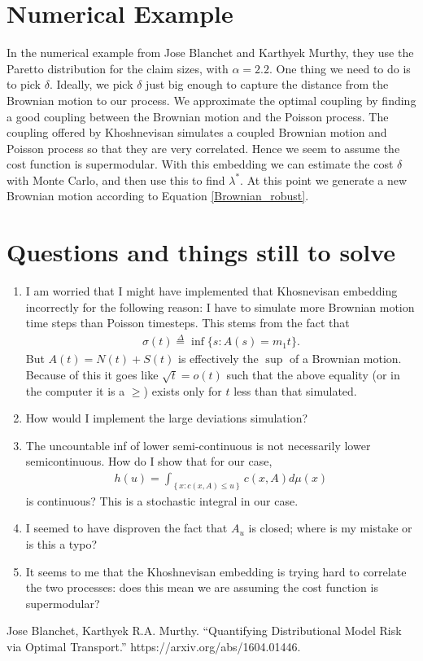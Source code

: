 \documentclass[12pt]{article}
\newcommand{\define}{\overset{\Delta}{=}}
\theoremstyle{definition}
\theoremstyle{definition}
\theoremstyle{definition}
\begin{document}
\section*{Numerical Example}
In the numerical example from Jose Blanchet and Karthyek Murthy, they use the Paretto distribution for the claim sizes, with $\alpha=2.2$. One thing we need to do is to pick $\delta$. Ideally, we pick $\delta$ just big enough to capture the distance from the Brownian motion to our process. We approximate the optimal coupling by finding a good coupling between the Brownian motion and the Poisson process. The coupling offered by Khoshnevisan simulates a coupled Brownian motion and Poisson process so that they are very correlated. Hence we seem to assume the cost function is supermodular. With this embedding we can estimate the cost $\delta$ with Monte Carlo, and then use this to find $\lambda^*$. At this point we generate a new Brownian motion according to Equation \ref{Brownian_robust}. 


\section*{Questions and things still to solve}
\begin{enumerate}
\item I am worried that I might have implemented that Khosnevisan embedding incorrectly for the following reason: I have to simulate more Brownian motion time steps than Poisson timesteps. This stems from the fact that 
\begin{align*}
\sigma(t)\define\inf\{s: A(s)=m_1t\}.
\end{align*}
But $A(t)=N(t)+S(t)$ is effectively the $\sup$ of a Brownian motion. Because of this it goes like $\sqrt{t}=o(t)$ such that the above equality (or in the computer it is a $\geq$) exists only for $t$ less than that simulated.

\item How would I implement the large deviations simulation?

\item The uncountable inf of lower semi-continuous is not necessarily lower semicontinuous. How do I show that for our case,
\begin{align*}
h(u)=\int_{\left\{x:c(x,A)\leq u\right\}}^{}c(x,A)d\mu(x)
\end{align*}
is continuous? This is a stochastic integral in our case.
\item  I seemed to have disproven the fact that $A_u$ is closed; where is my mistake or is this a typo?
\item It seems to me that the Khoshnevisan embedding is trying hard to correlate the two processes: does this mean we are assuming the cost function is supermodular?

\end{enumerate}

\begin{thebibliography}{9}
 Jose Blanchet, Karthyek R.A. Murthy. ``Quantifying Distributional Model Risk via Optimal Transport.'' https://arxiv.org/abs/1604.01446.
\end{thebibliography}
\end{document}
